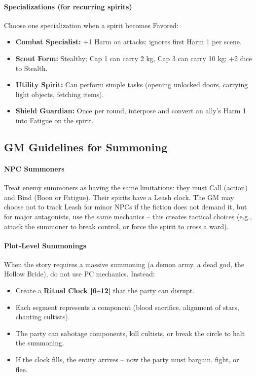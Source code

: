 \paragraph{Specializations (for recurring spirits)}
Choose one specialization when a spirit becomes Favored:
\begin{itemize}
  \item \textbf{Combat Specialist:} +1 Harm on attacks; ignores first Harm 1 per scene.
  \item \textbf{Scout Form:} Stealthy; Cap 1 can carry 2 kg, Cap 3 can carry 10 kg; +2 dice to Stealth.
  \item \textbf{Utility Spirit:} Can perform simple tasks (opening unlocked doors, carrying light objects, fetching items).
  \item \textbf{Shield Guardian:} Once per round, interpose and convert an ally's Harm 1 into Fatigue on the spirit.
\end{itemize}

\subsection{GM Guidelines for Summoning}

\paragraph{NPC Summoners}
Treat enemy summoners as having the same limitations: they must Call (action) and Bind (Boon or Fatigue). Their spirits have a Leash clock. The GM may choose not to track Leash for minor NPCs if the fiction does not demand it, but for major antagonists, use the same mechanics -- this creates tactical choices (e.g., attack the summoner to break control, or force the spirit to cross a ward).

\paragraph{Plot‑Level Summonings}
When the story requires a massive summoning (a demon army, a dead god, the Hollow Bride), do not use PC mechanics. Instead:
\begin{itemize}
  \item Create a \textbf{Ritual Clock [6--12]} that the party can disrupt.
  \item Each segment represents a component (blood sacrifice, alignment of stars, chanting cultists).
  \item The party can sabotage components, kill cultists, or break the circle to halt the summoning.
  \item If the clock fills, the entity arrives -- now the party must bargain, fight, or flee.
\end{itemize}

